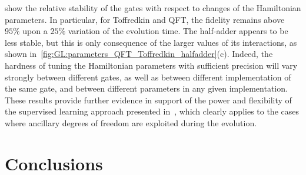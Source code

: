  show the relative stability of the gates with respect to changes of the Hamiltonian parameters.
In particular, for Toffredkin and \ac{QFT}, the fidelity remains above $95\%$ upon a $25\%$ variation of the evolution time.
The half-adder appears to be less stable, but this is only consequence of the larger values of its interactions, as shown in~\cref{fig:GL:parameters_QFT_Toffredkin_halfadder}(c).
Indeed, the hardness of tuning the Hamiltonian parameters with sufficient precision will vary strongly between different gates, as well as between different implementation of the same gate, and between different parameters in any given implementation.
These results provide further evidence in support of the power and flexibility of the supervised learning approach presented in~\cite{innocenti2018supervised,banchi2016quantum}, which clearly applies to the cases where ancillary degrees of freedom are exploited during the evolution.


\section{Conclusions}
\label{sec:GL:conclusions}

